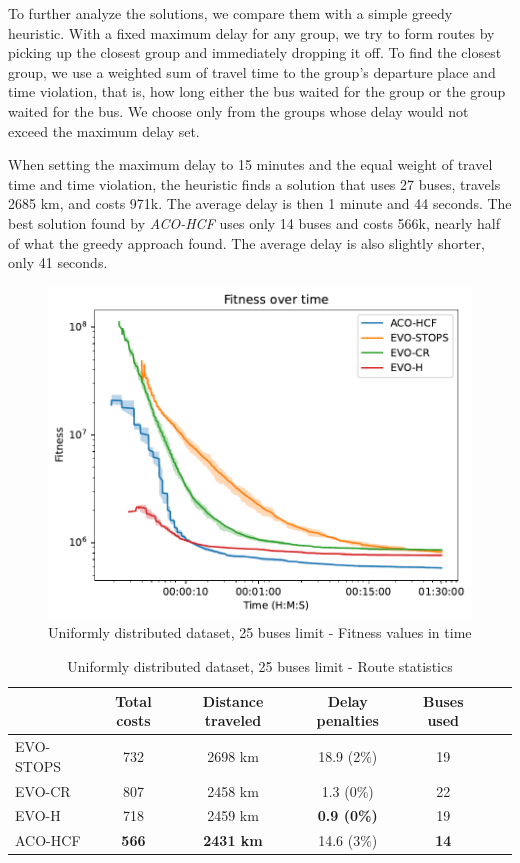 \label{experiments-greedy}To further analyze the solutions, we compare them with a simple greedy heuristic. With a fixed maximum delay for any group, we try to form routes by picking up the closest group and immediately dropping it off. To find the closest group, we use a weighted sum of travel time to the group's departure place and time violation, that is, how long either the bus waited for the group or the group waited for the bus. We choose only from the groups whose delay would not exceed the maximum delay set.

When setting the maximum delay to 15 minutes and the equal weight of travel time and time violation, the heuristic finds a solution that uses 27 buses, travels 2685 km, and costs 971k. The average delay is then 1 minute and 44 seconds. The best solution found by \textit{ACO-HCF} uses only 14 buses and costs 566k, nearly half of what the greedy approach found. The average delay is also slightly shorter, only 41 seconds.

\clearpage

\begin{figure}
    \centering
    \includegraphics[width=1\linewidth]
    {img/exp_random_25b_100_time.pdf}
    \caption{Uniformly distributed dataset, 25 buses limit - Fitness values in time}
    \label{fig:exp_random_25}
\end{figure}

\begin{table}
    \centering
    \begin{tabular}{lcccccc}
         & Total costs & Distance traveled & Delay penalties & Buses used \\
         \hline
         EVO-STOPS & 732 & 2698 km & 18.9 (2\%) & 19 \\
         EVO-CR & 807 & 2458 km & 1.3 (0\%) & 22 \\
         EVO-H & 718 & 2459 km & \textbf{0.9 (0\%)} & 19 \\
         ACO-HCF & \textbf{566} & \textbf{2431 km} & 14.6 (3\%) & \textbf{14}
    \end{tabular}
    \caption{Uniformly distributed dataset, 25 buses limit - Route statistics}
    \label{tab:exp_random_25_route_stats}
\end{table}

